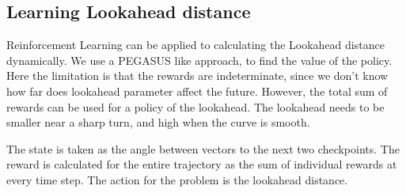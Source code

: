 \documentclass[hidelinks,BTech]{iitmdiss}
\begin{document}
\subsection*{Learning Lookahead distance}
Reinforcement Learning can be applied to calculating the Lookahead distance dynamically. We use a PEGASUS like approach, to find the value of the policy. Here the limitation is that the rewards are indeterminate, since we don't know how far does lookahead parameter affect the future. However, the total sum of rewards can be used for a policy of the lookahead. The lookahead needs to be smaller near a sharp turn, and high when the curve is smooth.

The state is taken as the angle between vectors to the next two checkpoints. The reward is calculated for the entire trajectory as the sum of individual rewards at every time step. The action for the problem is the lookahead distance.
\end{document}
